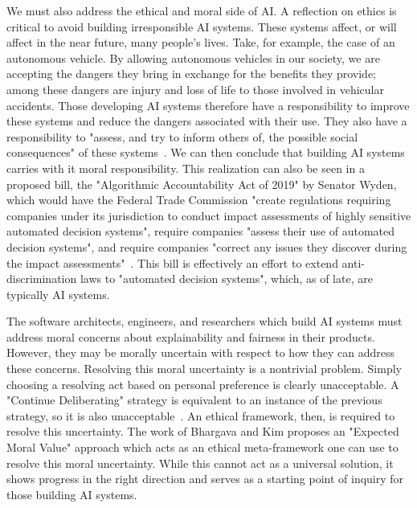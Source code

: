 \documentclass[]{report}
\begin{document}
We must also address the ethical and moral side of AI. A reflection on ethics is critical to avoid
building irresponsible AI systems. These systems affect, or will affect in the near future, many
people's lives. Take, for example, the case of an autonomous vehicle. By allowing autonomous
vehicles in our society, we are accepting the dangers they bring in exchange for the benefits they
provide; among these dangers are injury and loss of life to those involved in vehicular accidents.
Those developing AI systems therefore have a responsibility to improve these systems and reduce the
dangers associated with their use. They also have a responsibility to "assess, and try to inform
others of, the possible social consequences" of these systems~\cite{patrick2017robot}. We can then
conclude that building AI systems carries with it moral responsibility. This realization can also be
seen in a proposed bill, the "Algorithmic Accountability Act of 2019" by Senator Wyden, which would
have the Federal Trade Commission "create regulations requiring companies under its jurisdiction to
conduct impact assessments of highly sensitive automated decision systems", require companies
"assess their use of automated decision systems", and require companies "correct any issues they
discover during the impact assessments"~\cite{wyden2019bill}. This bill is effectively an effort to
extend anti-discrimination laws to "automated decision systems", which, as of late, are typically AI
systems.

The software architects, engineers, and researchers which build AI systems must address moral
concerns about explainability and fairness in their products. However, they may be morally uncertain
with respect to how they can address these concerns. Resolving this moral uncertainty is a
nontrivial problem. Simply choosing a resolving act based on personal preference is clearly
unacceptable. A "Continue Deliberating" strategy is equivalent to an instance of the previous
strategy, so it is also unacceptable~\cite{patrick2017robot}. An ethical framework, then, is
required to resolve this uncertainty. The work of Bhargava and Kim \cite{patrick2017robot} proposes
an "Expected Moral Value" approach which acts as an ethical meta-framework one can use to resolve
this moral uncertainty. While this cannot act as a universal solution, it shows progress in the
right direction and serves as a starting point of inquiry for those building AI systems.
\end{document}
